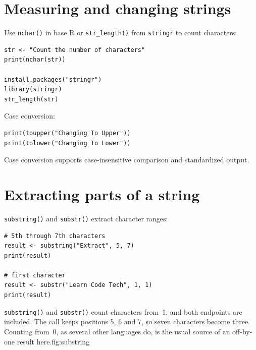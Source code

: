\section{Measuring and changing strings}

Use \texttt{nchar()} in base R or \texttt{str\_length()} from \texttt{stringr} to count characters:

\begin{lstlisting}[style=dsr]
str <- "Count the number of characters"
print(nchar(str))

install.packages("stringr")
library(stringr)
str_length(str)
\end{lstlisting}

Case conversion:

\begin{lstlisting}[style=dsr]
print(toupper("Changing To Upper"))
print(tolower("Changing To Lower"))
\end{lstlisting}

Case conversion supports case-insensitive comparison and standardized output.

\section{Extracting parts of a string}

\texttt{substring()} and \texttt{substr()} extract character ranges:

\begin{lstlisting}[style=dsr]
# 5th through 7th characters
result <- substring("Extract", 5, 7)
print(result)

# first character
result <- substr("Learn Code Tech", 1, 1)
print(result)
\end{lstlisting}

\begin{utpfig}{\texttt{substring()} and
\texttt{substr()} count characters from~1, and both endpoints are included. The
call keeps positions 5, 6 and 7, so seven characters become three. Counting
from~0, as several other languages do, is the usual source of an off-by-one
result here.}{fig:substring}
\end{utpfig}

